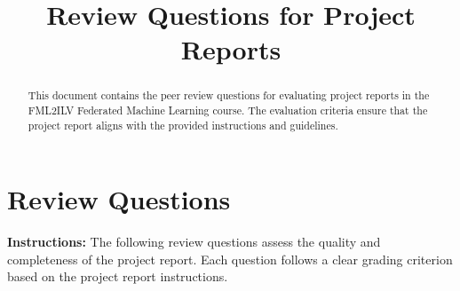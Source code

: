 \documentclass{article}
\title{Review Questions for Project Reports}
\begin{document}
	\maketitle
	
	\begin{abstract}
		This document contains the peer review questions for evaluating project reports in the FML2ILV Federated Machine Learning course. The evaluation criteria ensure that the project report aligns with the provided instructions and guidelines.
	\end{abstract}
	
	\section{Review Questions}
	
	\textbf{Instructions:} The following review questions assess the quality and completeness of the project report. Each question follows a clear grading criterion based on the project report instructions.
	
\end{document}
